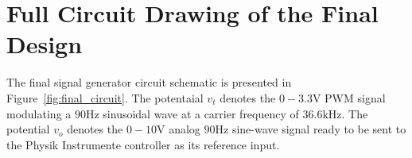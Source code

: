 %

%

\section{Full Circuit Drawing of the Final Design}
\label{sec:fulldesign}

The final signal generator circuit schematic is presented in
Figure~\ref{fig:final_circuit}. The potentaial $v_t$ denotes the
$0-3.3$\unit{\volt} PWM signal modulating a $90$\unit{\hertz} sinusoidal wave at
a carrier frequency of $36.6$\unit{\kilo\hertz}. The potential $v_o$ denotes the
$0-10$\unit{\volt} analog $90$\unit{\hertz} sine-wave signal ready to be sent to
the Physik Instrumente controller as its reference input.

